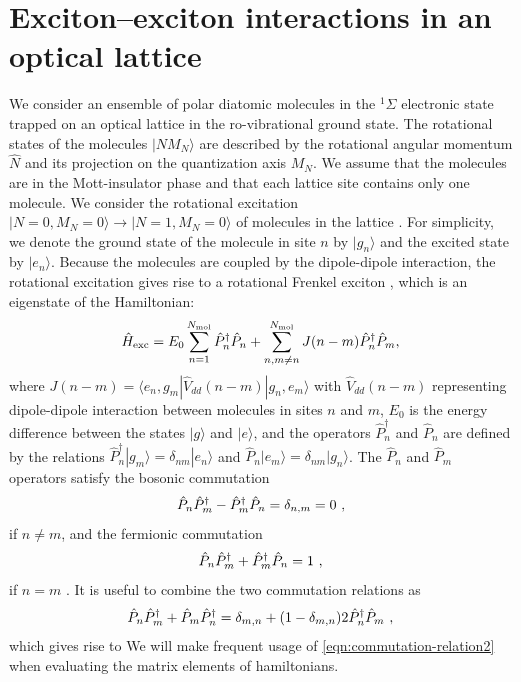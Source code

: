 \section{Exciton--exciton interactions in an optical lattice}
We consider an ensemble of polar diatomic molecules in the $^1\Sigma$ electronic state trapped on an optical lattice 
in the ro-vibrational ground state. The rotational states of the molecules $|NM_N\rangle$ are described by the
 rotational angular momentum $\hat{N}$ and its projection on the quantization axis $M_{N}$. We assume that the
 molecules are in the Mott-insulator phase \cite{umol, umol2, umol3} and that each lattice site contains only one
 molecule.  We consider the rotational excitation $|N=0, M_N = 0 \rangle \rightarrow |N = 1, M_N = 0 \rangle$ of
 molecules in the lattice \cite{note}. For simplicity, we denote the ground state of the molecule in site $n$ by 
$|g_{n}\rangle$ and the excited state by $|e_{n}\rangle$.  Because the molecules are coupled by the dipole-dipole
 interaction, the rotational excitation gives rise to a rotational Frenkel exciton \cite{felipe}, which is an eigenstate of
 the Hamiltonian: 
\begin{equation}
\hat{H}_{\rm exc} = E_0 \sum\limits_{n=1}^{N_{\rm mol}} \hat{P}_n^\dag
\hat{P}_n +  \sum\limits_{n,m \neq n}^{N_{\rm mol}}
J(n-m)\hat{P}_n^\dag \hat{P}_m,
\label{exciton}
\end{equation}
where $J(n-m) = \langle e_{n} , g_{m} | \hat{V}_{dd}(n-m) | g_{n}, e_{m} \rangle$ with $\hat{V}_{dd}(n-m)$ representing
 dipole-dipole interaction between molecules in sites $n$ and $m$, $E_0$ is the energy difference between the states
 $|g\rangle$ and $|e\rangle$, and the operators $\hat{P}_n^\dag$ and $\hat{P}_n$ are defined by the relations 
$\hat{P}_n^\dag | g_{m} \rangle = \delta_{nm} | e_{n}
\rangle$ and $\hat{P}_n | e_{m} \rangle = \delta_{nm} | g_{n} \rangle$.
The $\hat{P}_n$ and $\hat{P}_m$ operators satisfy the bosonic commutation
\begin{equation}
\hat{P}_{n}\hat{P}^{\dagger}_{m} - \hat{P}^{\dagger}_{m}\hat{P}_{n} = \delta_{n,m} = 0 \  ,
\end{equation}
 if $n \neq m$, and the fermionic commutation
\begin{equation}
\hat{P}_{n}\hat{P}^{\dagger}_{m} + \hat{P}^{\dagger}_{m}\hat{P}_{n} = 1 \  ,
\end{equation}
 if $n = m$ \cite{agranovich}. It is useful to combine the two commutation relations as 
\begin{equation}
\p{n}\pd{m} + \p{m}\pd{n} = \delta_{m,n} + (1-\delta_{m,n})2\pd{n}\p{m} \ ,  \label{eqn:commutation-relation}
\end{equation}
which gives rise to 
We will make frequent usage of \autoref{eqn:commutation-relation2} when evaluating the matrix elements of hamiltonians. 


